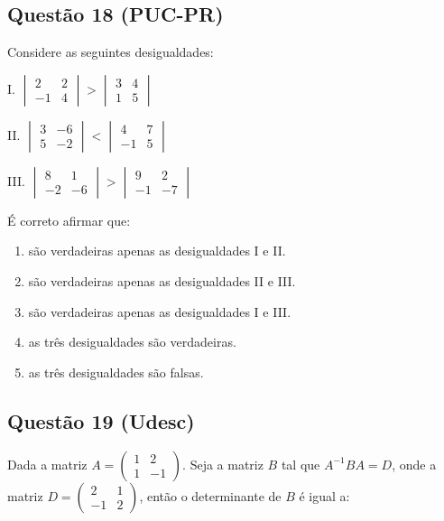 \documentclass{article}
\begin{document}
\begin{multicols}{2}
		\subsection*{Questão 18 (PUC-PR)}
		Considere as seguintes desigualdades:
		
		I. \(\begin{vmatrix} 2 & 2 \\ -1 & 4 \end{vmatrix} > \begin{vmatrix} 3 & 4 \\ 1 & 5 \end{vmatrix}\)
		
		II. \(\begin{vmatrix} 3 & -6 \\ 5 & -2 \end{vmatrix} < \begin{vmatrix} 4 & 7 \\ -1 & 5 \end{vmatrix}\)
		
		III. \(\begin{vmatrix} 8 & 1 \\ -2 & -6 \end{vmatrix} > \begin{vmatrix} 9 & 2 \\ -1 & -7 \end{vmatrix}\)
		
		É correto afirmar que:
		
		\begin{enumerate}[label=(\Alph*), noitemsep]
			\item são verdadeiras apenas as desigualdades I e II.
			\item são verdadeiras apenas as desigualdades II e III.
			\item são verdadeiras apenas as desigualdades I e III.
			\item as três desigualdades são verdadeiras.
			\item as três desigualdades são falsas.
		\end{enumerate}
		
		\subsection*{Questão 19 (Udesc)}
		Dada a matriz \( A = \begin{pmatrix} 1 & 2 \\ 1 & -1 \end{pmatrix} \). Seja a matriz \( B \) tal que \( A^{-1} BA = D \), onde a matriz \( D = \begin{pmatrix} 2 & 1 \\ -1 & 2 \end{pmatrix} \), então o determinante de \( B \) é igual a:
		

\end{multicols}
\end{document}
